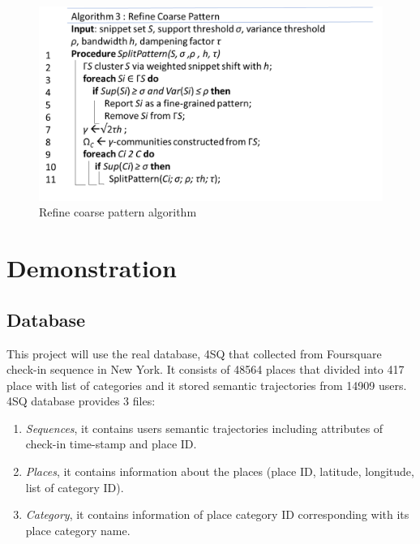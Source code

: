 \documentclass[conference]{IEEEtran}
\begin{document}
\begin{figure}[!h]
	\centering
	\includegraphics[width=0.7\linewidth]{"refine coarse"}
	\caption{Refine coarse pattern algorithm \cite{zhang2014splitter}}
	\label{fig:refine-coarse}
\end{figure}

\section{Demonstration}

\subsection{Database}
This project will use the real database, 4SQ that collected from Foursquare check-in sequence in New York. It consists of 48564 places that divided into 417 place with list of categories and it stored semantic trajectories from 14909 users. 4SQ database provides 3 files:
\begin{enumerate}
\item \textit{Sequences}, it contains users semantic trajectories including attributes of check-in time-stamp and place ID.
\item \textit{Places}, it contains information about the places (place ID, latitude, longitude, list of category ID).
\item \textit{Category}, it contains information of place category ID corresponding with its place category name.
\end{enumerate}
\end{document}
